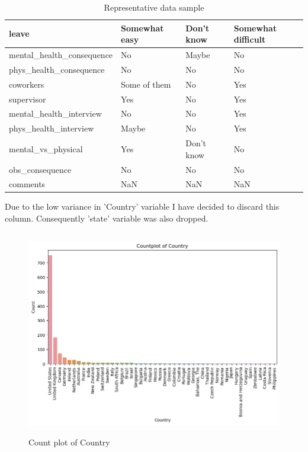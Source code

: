 \documentclass[conference]{IEEEtran}
\begin{document}
\begin{table}[h]
\begin{tabular}{|l|l|l|l|}
leave                       & Somewhat easy       & Don't know          & Somewhat difficult  \\ \hline
mental\_health\_consequence & No                  & Maybe               & No                  \\ \hline
phys\_health\_consequence   & No                  & No                  & No                  \\ \hline
coworkers                   & Some of them        & No                  & Yes                 \\ \hline
supervisor                  & Yes                 & No                  & Yes                 \\ \hline
mental\_health\_interview   & No                  & No                  & Yes                 \\ \hline
phys\_health\_interview     & Maybe               & No                  & Yes                 \\ \hline
mental\_vs\_physical        & Yes                 & Don't know          & No                  \\ \hline
obs\_consequence            & No                  & No                  & No                  \\ \hline
comments                    & NaN                 & NaN                 & NaN                 \\ \hline
\end{tabular}
\captionsetup{justification=centering, belowskip=10pt}
\caption{Representative data sample}
\label{tab:my-table}
\end{table}
Due to the low variance in 'Country' variable I have decided to discard this column. Consequently 'state' variable was also dropped.
\begin{figure}
    \centering
    \includegraphics[width=15cm, height=9cm]{images/countries.png}
    \caption{Count plot of Country}
\end{figure}
\end{document}
